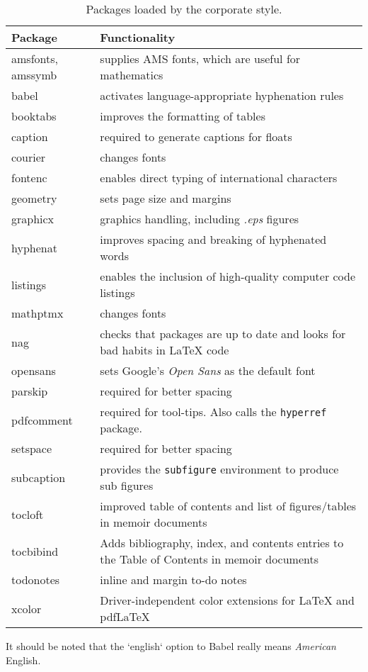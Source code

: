 \begin{table*}[!ht]
\centering
\caption[Packages loaded by the corporate style]{Packages loaded by the corporate style.}
\label{Tab:Packages}
\begin{tabular}{lp{}}
\toprule
Package &  Functionality\\
\midrule
amsfonts, amssymb & supplies AMS fonts, which are useful for mathematics \\
babel &  activates language-appropriate hyphenation rules\\
booktabs & improves the formatting of tables \\
caption & required to generate captions for floats\\
courier& changes fonts \\
fontenc &  enables direct typing of international characters \\
geometry & sets page size and margins \\
graphicx & graphics handling, including \emph{.eps} figures \\
hyphenat & improves spacing and breaking of hyphenated words \\
listings & enables the inclusion of high-quality computer code listings\\
mathptmx& changes fonts \\
nag & checks that packages are up to date and looks for bad habits in LaTeX code\\
opensans& sets Google's \emph{Open Sans} as the default font\\
parskip & required for better spacing\\
pdfcomment & required for tool-tips. Also calls the \texttt{hyperref} package.\\
setspace & required for better spacing\\
subcaption & provides the \texttt{subfigure} environment to produce sub figures \\
tocloft & improved table of contents and list of figures/tables in memoir documents\\
tocbibind &  Adds bibliography, index, and contents entries to the Table of Contents in memoir documents\\
todonotes &  inline and margin to-do notes \\
xcolor &  Driver-independent color extensions for LaTeX and pdfLaTeX\\
\bottomrule
\end{tabular}
\end{table*}

It should be noted that the `english` option to Babel really means \emph{American} English.
